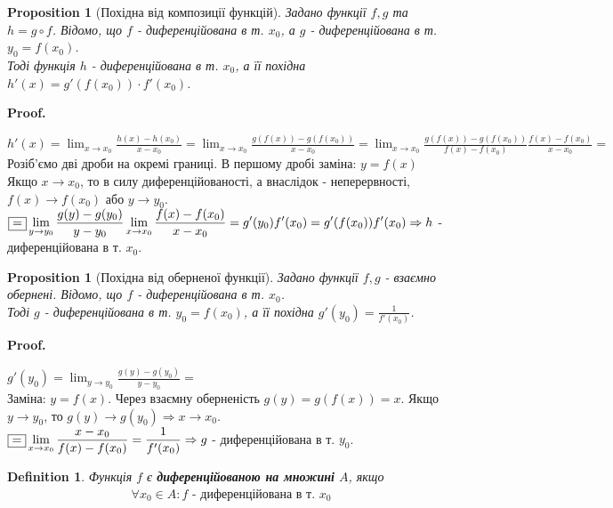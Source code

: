 \documentclass[a4paper, 14pt]{article}
\makeatletter
\def\huge{\displaystyle}
\def\qed{$\blacksquare$}
\theoremstyle{theoremdd}
\theoremstyle{theoremdd}
\newtheorem{definition}[theorem]{Definition}
\theoremstyle{theoremdd}
\theoremstyle{theoremdd}
\theoremstyle{theoremdd}
\newtheorem{proposition}[theorem]{Proposition}
\theoremstyle{theoremdd}
\theoremstyle{theoremdd}
\theoremstyle{theoremdd}
\renewenvironment{proof}[1][Proof.\\]{\par
\pushQED{\hfill \qed}%
\normalfont \topsep6\p@\@plus6\p@\relax
\trivlist
\item\relax
{\bfseries
#1\@addpunct{.}}\hspace\labelsep\ignorespaces
}{%
\popQED\endtrivlist\@endpefalse
}
\makeatother
\begin{document}
\begin{proposition}[Похідна від композиції функцій]
Задано функції $f,g$ та $h=g \circ f$. Відомо, що $f$ - диференційована в т. $x_0$, а $g$ - диференційована в т. $y_0 = f(x_0)$.\\
Тоді функція $h$ - диференційована в т. $x_0$, а її похідна $h'(x) = g'(f(x_0)) \cdot f'(x_0)$.
\end{proposition}

\begin{proof}
$h'(x) = \huge \lim_{x \to x_0} \frac{h(x)-h(x_0)}{x-x_0} = \lim_{x \to x_0} \frac{g(f(x))-g(f(x_0))}{x-x_0} = \lim_{x \to x_0} \frac{g(f(x))-g(f(x_0))}{f(x)-f(x_0)} \frac{f(x)-f(x_0)}{x-x_0} \boxed{=}$\\
Розіб'ємо дві дроби на окремі границі. В першому дробі заміна: $y=f(x)$\\
Якщо $x \to x_0$, то в силу диференційованості, а внаслідок - неперервності, $f(x) \to f(x_0)$ або $y \to y_0$.\\
$\boxed{=} \huge \lim_{y \to y_0} \frac{g(y)-g(y_0)}{y-y_0} \lim_{x \to x_0} \frac{f(x)-f(x_0)}{x-x_0}= g'(y_0) f'(x_0)=g'(f(x_0))f'(x_0) \\ \Rightarrow h$ - диференційована в т. $x_0$.
\end{proof}

\begin{proposition}[Похідна від оберненої функції]
Задано функції $f,g$ - взаємно обернені. Відомо, що $f$ - диференційована в т. $x_0$. \\ Тоді $g$ - диференційована в т. $y_0 = f(x_0)$, а її похідна 
$g'(y_0) = \huge \frac{1}{f'(x_0)}$.
\end{proposition}

\begin{proof}
$g'(y_0) = \huge \lim_{y \to y_0} \frac{g(y)-g(y_0)}{y-y_0} \boxed{=}$\\
Заміна: $y = f(x)$. Через взаємну оберненість $g(y)=g(f(x))=x$. Якщо $y \to y_0$, то $g(y) \to g(y_0) \Rightarrow x \to x_0$.\\
$\boxed{=} \huge \lim_{x \to x_0}\frac{x-x_0}{f(x)-f(x_0)} = \frac{1}{f'(x_0)} \\ \Rightarrow g$ - диференційована в т. $y_0$.
\end{proof}

\begin{definition}
Функція $f$ є \textbf{диференційованою на множині} $A$, якщо
\begin{align*}
\forall x_0 \in A: f \text{ - диференційована в т. } x_0
\end{align*}
\end{definition}
\end{document}
